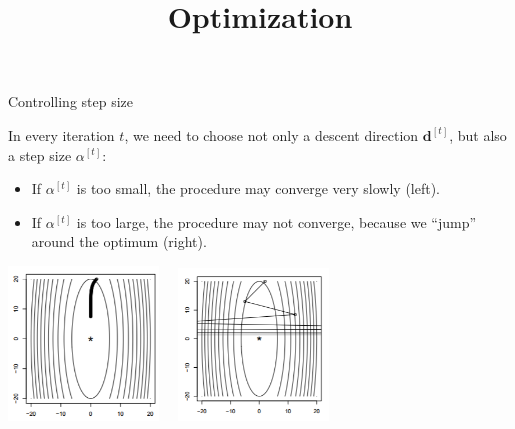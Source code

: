 







\newcommand{\learninggoals}{
\item LEARNING GOAL 1
\item LEARNING GOAL 2}



\title{Optimization}


	
	

	\begin{vbframe}{Controlling step size}
		
		In every iteration $t$, we need to choose not only a descent direction $\mathbf{d}^{[t]}$, but also a step size $\alpha^{[t]}$:
		\begin{itemize}
			\item If $\alpha^{[t]}$ is too small, the procedure may converge very slowly (left). 
			\item If $\alpha^{[t]}$ is too large, the procedure may not converge, because we \enquote{jump} around the optimum (right).

		\end{itemize}

		
		\begin{center}
			\includegraphics[width = 0.3\textwidth]{figure_man/stepsize_small.png}~~
			\includegraphics[width = 0.3\textwidth]{figure_man/stepsize_large.png}
		\end{center}
	\end{vbframe}
	
